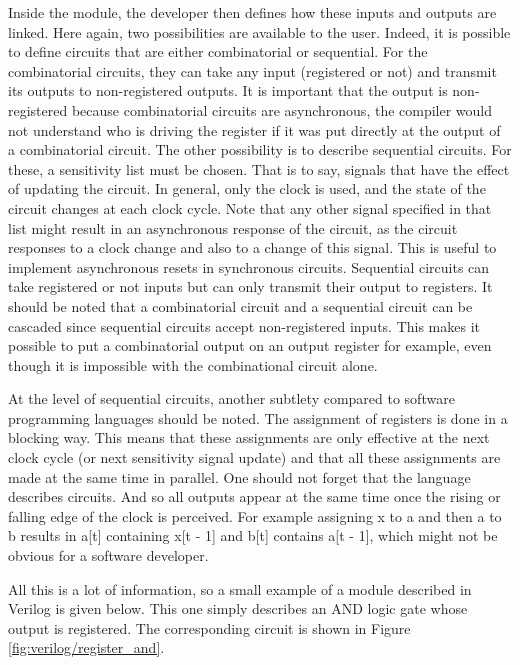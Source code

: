 Inside the module, the developer then defines how these inputs and outputs are linked. Here again, 
two possibilities are available to the user. Indeed, it is possible to define circuits that are 
either combinatorial or sequential. For the combinatorial circuits, they can take any input 
(registered or not) and transmit its outputs to non-registered outputs. It is important that the 
output is non-registered because combinatorial circuits are asynchronous, the compiler would not 
understand who is driving the register if it was put directly at the output of a combinatorial 
circuit. The other possibility is to describe sequential circuits. For these, a sensitivity list 
must be chosen. That is to say, signals that have the effect of updating the circuit. In 
general, only the clock is used, and the state of the circuit changes at each clock cycle. Note that
any other signal specified in that list might result in an asynchronous response of the circuit, as
the circuit responses to a clock change and also to a change of this signal. This is useful to
implement asynchronous resets in synchronous circuits. Sequential circuits can take registered or
not inputs but can only transmit their output to registers. It should be noted that a combinatorial 
circuit and a sequential circuit can be cascaded since sequential circuits accept non-registered 
inputs. This makes it possible to put a combinatorial output on an output register for example, even
though it is impossible with the combinational circuit alone. 

At the level of sequential circuits, another subtlety compared to software programming languages 
should be noted. The assignment of registers is done in a blocking way. This means that these 
assignments are only effective at the next clock cycle (or next sensitivity signal update) and 
that all these assignments are made at the same time in parallel. One should not forget that the 
language describes circuits. And so all outputs appear at the same time once the rising or falling 
edge of the clock is perceived. For example assigning x to a and then a to b results in
a[t] containing x[t - 1] and b[t] contains a[t - 1], which might not be obvious for a software
developer.

All this is a lot of information, so a small example of a module described in Verilog is given 
below. This one simply describes an AND logic gate whose output is registered. The corresponding 
circuit is shown in Figure \ref{fig:verilog/register_and}.

